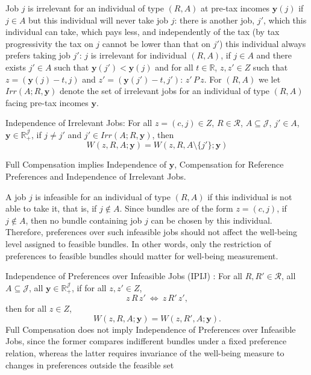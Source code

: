 \documentclass[12pt]{article}
\begin{document}
Job $j$ is irrelevant for an individual of type $(R,A)$ at pre-tax incomes $\mathbf{y}(j)$ if $j\in A$ but this individual will never take job $j$: there is another job, $j'$, which this individual can take, which pays less, and independently of the tax (by tax progressivity the tax on $j$ cannot be lower than that on $j'$) this individual always prefers taking job $j'$: $j$ is irrelevant for individual $(R,A)$, if $j\in A$ and there exists $j'\in A$ such that $\mathbf{y}(j')<\mathbf{y}(j)$ and for all $t\in\mathbb{R}$, $z,z'\in Z$ such that $z=(\mathbf{y}(j)-t,j)$ and $z'=(\mathbf{y}(j')-t,j')$: $z'\,P\,z$. For $(R,A)$ we let $Irr(A;R,\mathbf{y})$ denote the set of irrelevant jobs for an individual of type $(R,A)$ facing pre-tax incomes $\mathbf{y}$.

Independence of Irrelevant Jobs: For all $z=(c,j)\in Z$, $R\in \mathcal{R}$, $A\subseteq \mathcal{J}$, $j'\in A$, $\mathbf{y} \in \mathbb{R}_{+}^{\mathcal{J}}$, if $j\neq j'$ and $j'\in Irr(A;R,\mathbf{y})$, then
\begin{equation*}
\label{ }
W(z,R,A;\mathbf{y})=W(z,R,A\setminus\{j'\};\mathbf{y})
\end{equation*}

Full Compensation implies Independence of $\mathbf{y}$, Compensation for Reference Preferences and Independence of Irrelevant Jobs.



A job $j$ is infeasible for an individual of type $(R,A)$ if this individual is not able to take it, that is, if $j\notin A$. Since bundles are of the form $z=(c,j)$, if $j\notin A$, then no bundle containing job $j$ can be chosen by this individual. Therefore, preferences over such infeasible jobs should not affect the well-being level assigned to feasible bundles. In other words, only the restriction of preferences to feasible bundles should matter for well-being measurement.

Independence of Preferences over Infeasible Jobs (IPIJ) : 
For all $R,R'\in\mathcal R$, all $A\subseteq \mathcal J$, all $\mathbf y\in\mathbb R_+^{\mathcal J}$, if for all $z,z'\in Z$,
\[
z\,R\,z' \ \Longleftrightarrow\ z\,R'\,z',
\]
then for all $z\in Z $,
\begin{equation*}
\label{}
W(z,R,A;\mathbf y)=W(z,R',A;\mathbf y).
\end{equation*}
Full Compensation does not imply Independence of Preferences over Infeasible Jobs, since the former compares indifferent bundles under a fixed preference relation, whereas the latter requires invariance of the well-being measure to changes in preferences outside the feasible set
\end{document}
